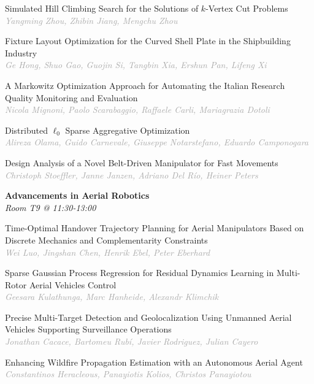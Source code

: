 \begin{multicols*}{2}
\small Simulated Hill Climbing Search for the Solutions of $k$-Vertex Cut Problems\\ 
\footnotesize \textcolor{darkgray}{\textit{Yangming Zhou, Zhibin  Jiang, Mengchu  Zhou}}

\small Fixture Layout Optimization for the Curved Shell Plate in the Shipbuilding Industry\\ 
\footnotesize \textcolor{darkgray}{\textit{Ge Hong, Shuo  Gao, Guojin  Si, Tangbin  Xia, Ershun  Pan, Lifeng  Xi}}

\small A Markowitz Optimization Approach for Automating the Italian Research Quality Monitoring and Evaluation\\ 
\footnotesize \textcolor{darkgray}{\textit{Nicola Mignoni, Paolo  Scarabaggio, Raffaele  Carli, Mariagrazia  Dotoli}}

\small Distributed $\ell_0$ Sparse Aggregative Optimization\\ 
\footnotesize \textcolor{darkgray}{\textit{Alireza Olama, Guido  Carnevale, Giuseppe  Notarstefano, Eduardo  Camponogara}}

\small Design Analysis of a Novel Belt-Driven Manipulator for Fast Movements\\ 
\footnotesize \textcolor{darkgray}{\textit{Christoph Stoeffler, Janne  Janzen, Adriano  Del Río, Heiner  Peters}}

\normalsize \textbf{Advancements in Aerial Robotics}\\
\small \textit{Room T9 @ 11:30-13:00}

\small Time-Optimal Handover Trajectory Planning for Aerial Manipulators Based on Discrete Mechanics and Complementarity Constraints\\ 
\footnotesize \textcolor{darkgray}{\textit{Wei Luo, Jingshan  Chen, Henrik  Ebel, Peter  Eberhard}}

\small Sparse Gaussian Process Regression for Residual Dynamics Learning in Multi-Rotor Aerial Vehicles Control\\ 
\footnotesize \textcolor{darkgray}{\textit{Geesara Kulathunga, Marc  Hanheide, Alexandr  Klimchik}}

\small Precise Multi-Target Detection and Geolocalization Using Unmanned Aerial Vehicles Supporting Surveillance Operations\\ 
\footnotesize \textcolor{darkgray}{\textit{Jonathan Cacace, Bartomeu  Rubí, Javier  Rodriguez, Julian  Cayero}}

\small Enhancing Wildfire Propagation Estimation with an Autonomous Aerial Agent\\ 
\footnotesize \textcolor{darkgray}{\textit{Constantinos Heracleous, Panayiotis  Kolios, Christos  Panayiotou}}


\end{multicols*}
